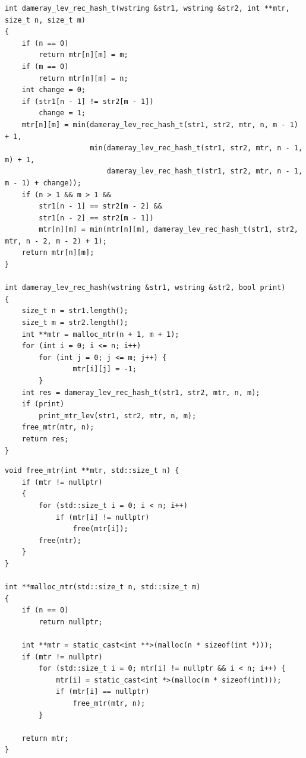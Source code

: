 \documentclass[a4paper,14pt, unknownkeysallowed]{bmstu}
\begin{document}
\clearpage

\begin{lstlisting}[label=lst:dameray_lev_rec_hash,caption=Функция нахождения расстояния Дамерау-Левенштейна рекурсивно c кэшированием]
int dameray_lev_rec_hash_t(wstring &str1, wstring &str2, int **mtr, size_t n, size_t m)
{
    if (n == 0)
        return mtr[n][m] = m;
    if (m == 0)
        return mtr[n][m] = n;
    int change = 0;
    if (str1[n - 1] != str2[m - 1])
        change = 1;
    mtr[n][m] = min(dameray_lev_rec_hash_t(str1, str2, mtr, n, m - 1) + 1,
                    min(dameray_lev_rec_hash_t(str1, str2, mtr, n - 1, m) + 1,
                        dameray_lev_rec_hash_t(str1, str2, mtr, n - 1, m - 1) + change));
    if (n > 1 && m > 1 &&
        str1[n - 1] == str2[m - 2] &&
        str1[n - 2] == str2[m - 1])
        mtr[n][m] = min(mtr[n][m], dameray_lev_rec_hash_t(str1, str2, mtr, n - 2, m - 2) + 1);
    return mtr[n][m];
}

int dameray_lev_rec_hash(wstring &str1, wstring &str2, bool print)
{
    size_t n = str1.length();
    size_t m = str2.length();
    int **mtr = malloc_mtr(n + 1, m + 1);
    for (int i = 0; i <= n; i++)
        for (int j = 0; j <= m; j++) {
                mtr[i][j] = -1;
        }
    int res = dameray_lev_rec_hash_t(str1, str2, mtr, n, m);
    if (print)
        print_mtr_lev(str1, str2, mtr, n, m);
    free_mtr(mtr, n);
    return res;
}
\end{lstlisting}

\clearpage

\begin{lstlisting}[label=lst:allocate_mtr,caption=Функции динамического выделения и очищения памяти под матрицу]
void free_mtr(int **mtr, std::size_t n) {
    if (mtr != nullptr)
    {
        for (std::size_t i = 0; i < n; i++)
            if (mtr[i] != nullptr)
                free(mtr[i]);
        free(mtr);
    }
}

int **malloc_mtr(std::size_t n, std::size_t m)
{
    if (n == 0)
        return nullptr;

    int **mtr = static_cast<int **>(malloc(n * sizeof(int *)));
    if (mtr != nullptr)
        for (std::size_t i = 0; mtr[i] != nullptr && i < n; i++) {
            mtr[i] = static_cast<int *>(malloc(m * sizeof(int)));
            if (mtr[i] == nullptr)
                free_mtr(mtr, n);
        }

    return mtr;
}
\end{lstlisting}

\clearpage
\end{document}
